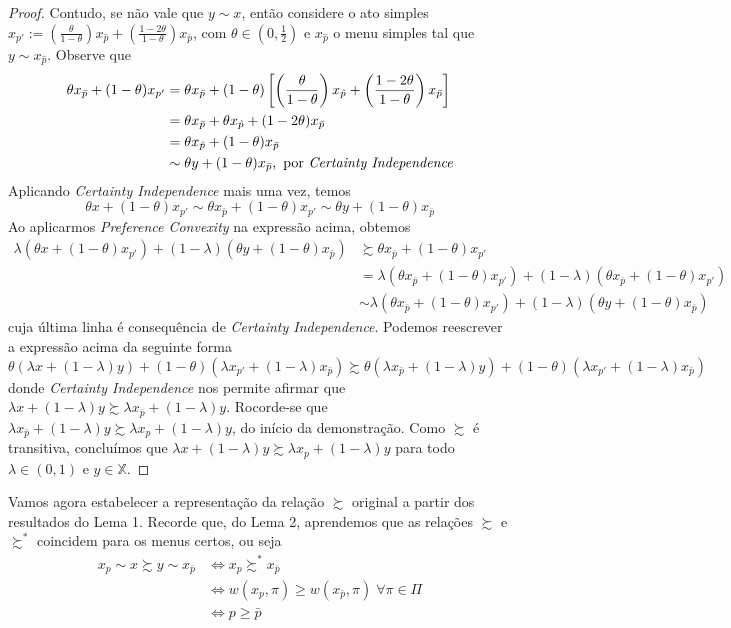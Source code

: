 \documentclass[11pt, a4paper]{article}
\theoremstyle{nonumberplain}
\newtheorem{proof}{Dem.}
\theoremstyle{plain}
\theoremstyle{plain}
\begin{document}
\begin{proof}
Contudo, se não vale que $y\sim x$, então considere o ato simples $x_{p'}:=\left(\frac{\theta}{1-\theta}\right)x_{\hat{p}}+\left(\frac{1-2\theta}{1-\theta}\right)x_{\bar{p}}$, com $\theta\in \left(0,\frac{1}{2}\right)$ e $x_{\hat{p}}$ o menu simples tal que $y\sim x_{\hat{p}}$. Observe que   
\begin{align*}
\theta x_{\bar{p}} + (1-\theta)x_{p'}&=\theta x_{\bar{p}} + (1-\theta)\left[ \left(\frac{\theta}{1-\theta}\right)x_{\hat{p}}+\left(\frac{1-2\theta}{1-\theta}\right)x_{\bar{p}}\right] \\ 
&=\theta x_{\bar{p}} + \theta x_{\hat{p}} + (1-2\theta)x_{\bar{p}} \\
&=\theta x_{\hat{p}} + (1-\theta)x_{\bar{p}} \\
&\sim \theta y + (1-\theta) x_{\bar{p}}, \text{ por \emph{Certainty Independence}}
\end{align*}
Aplicando \emph{Certainty Independence} mais uma vez, temos $$\theta x + (1-\theta)x_{p'}\sim \theta x_{\bar{p}} + (1-\theta)x_{p'}\sim \theta y + (1-\theta) x_{\bar{p}}$$
Ao aplicarmos \emph{Preference Convexity} na expressão acima, obtemos 
\begin{align*}
\lambda (\theta x + (1-\theta)x_{p'})+(1-\lambda)(\theta y + (1-\theta) x_{\bar{p}}) &\succsim \theta x_{\bar{p}} + (1-\theta)x_{p'}\\
&= \lambda (\theta x_{\bar{p}} + (1-\theta)x_{p'}) + (1-\lambda)(\theta x_{\bar{p}} + (1-\theta)x_{p'})\\
&\sim \lambda(\theta x_{\bar{p}} + (1-\theta)x_{p'})+(1-\lambda)(\theta y + (1-\theta) x_{\bar{p}})
\end{align*}
cuja última linha é consequência de \emph{Certainty Independence}. Podemos reescrever a expressão acima da seguinte forma
$$ \theta (\lambda x + (1-\lambda)y)+(1-\theta)(\lambda x_{p'}+(1-\lambda)x_{\bar{p}}) \succsim \theta (\lambda x_{\bar{p}} + (1-\lambda)y)+(1-\theta)(\lambda x_{p'}+(1-\lambda)x_{\bar{p}})$$
donde \emph{Certainty Independence} nos permite afirmar que $\lambda x + (1-\lambda)y\succsim \lambda x_{\bar{p}} + (1-\lambda)y$. Rocorde-se que $\lambda x_{\bar{p}} + (1-\lambda)y\succsim \lambda x_p + (1-\lambda)y$, do início da demonstração. Como $\succsim$ é transitiva, concluímos que $\lambda x + (1-\lambda)y\succsim \lambda x_p + (1-\lambda)y$ para todo $\lambda \in (0,1)$ e $y\in \mathbb{X}$.
\end{proof}

Vamos agora estabelecer a representação da relação $\succsim$ original a partir dos resultados do Lema 1. Recorde que, do Lema 2, aprendemos que as relações $\succsim$ e $\succsim^*$ coincidem para os menus certos, ou seja
\begin{align*}
x_p\sim x\succsim y\sim x_{\bar{p}}&\Leftrightarrow x_p\succsim^* x_{\bar{p}}\\
&\Leftrightarrow w(x_p,\pi)\geq w(x_{\bar{p}},\pi)\; \forall\pi\in\Pi \\
&\Leftrightarrow p\geq \bar{p}
\end{align*}
\end{document}

